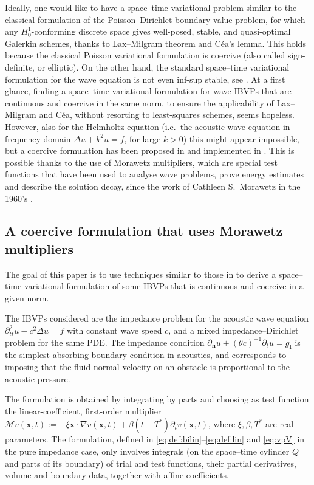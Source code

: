 \documentclass[a4paper]{article}
\theoremstyle{plain}
\theoremstyle{definition}
\newcommand{\operator}[1]{\mathcal{#1}}
\newcommand{\TimeDer}{{\partial^{}_t}}
\newcommand{\SecondTimeDer}{{\partial^2_{tt}}}
\newcommand{\NormDer}{{\partial_{\bm{n}}}}
\newcommand{\vect}[1]{\bm{#1}}
\newcommand{\gI}{{g_{\mathrm I}}}
\newcommand{\oM}{{\operator{M}}}
\newcommand{\vx}{{\vect x}}
\begin{document}
Ideally, one would like to have a space--time variational problem similar to the classical formulation of the Poisson--Dirichlet boundary value problem, for which any $H^1_0$-conforming discrete space gives well-posed, stable, and quasi-optimal Galerkin schemes, thanks to Lax--Milgram theorem and C\'ea's lemma.
This holds because the classical Poisson variational formulation is coercive (also called sign-definite, or elliptic).
On the other hand, the standard space--time variational formulation for the wave equation is not even inf-sup stable, see \cite[Thm.~1.1]{steinbach2022generalized}.
At a first glance, finding a space--time variational formulation for wave IBVPs that are continuous and coercive in the same norm, to ensure the applicability of Lax--Milgram and C\'ea, without resorting to least-squares schemes, seems hopeless.
However, also for the Helmholtz equation (i.e.\ the acoustic wave equation in frequency domain $\Delta u+k^2u=f$, for large $k>0$) this might appear impossible, but a coercive formulation has been proposed in \cite{Moiola2014} and implemented in \cite{DiwanMoiolaSpence2019}.
This is possible thanks to the use of Morawetz multipliers, which are special test functions that have been used to analyse wave problems, prove energy estimates and describe the solution decay, since the work of Cathleen S.~Morawetz in the 1960's \cite{morawetz1961decay,morawetz1975decay}.


\subsection{A coercive formulation that uses Morawetz multipliers}
The goal of this paper is to use techniques similar to those in \cite{Moiola2014} to derive a space--time variational formulation of some IBVPs that is continuous and coercive in a given norm.

The IBVPs considered are the impedance problem for the acoustic wave equation $\SecondTimeDer{u}-c^2\Delta u=f$ with constant wave speed $c$, and a mixed impedance--Dirichlet problem for the same PDE.
The impedance condition $\NormDer u + (\theta c)^{-1}\TimeDer{u} = \gI$ is the simplest absorbing boundary condition in acoustics, and corresponds to imposing that the fluid normal velocity on an obstacle is proportional to the acoustic pressure.

The formulation is obtained by integrating by parts and choosing as test function the linear-coefficient, first-order multiplier $\oM v(\vx,t):=-\xi\vx\cdot\nabla v(\vx,t)+\beta(t-T^*)\TimeDer v(\vx,t)$, where $\xi,\beta,T^*$ are real parameters.
The formulation, defined in \eqref{eq:def:bilin}--\eqref{eq:def:lin} and \eqref{eq:vpV} in the pure impedance case, only involves integrals (on the space--time cylinder $Q$ and parts of its boundary) of trial and test functions, their partial derivatives, volume and boundary data, together with affine coefficients.
\end{document}
